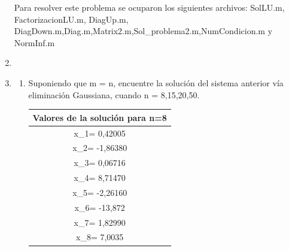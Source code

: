 \documentclass{udpreport}
\begin{document}
\begin{enumerate}
             	Para resolver este problema se ocuparon los siguientes archivos: SolLU.m, FactorizacionLU.m, DiagUp.m, DiagDown.m,Diag.m,Matrix2.m,Sol\_problema2.m,NumCondicion.m y NormInf.m	
        \item
        \item
                \begin{enumerate}
            \item Suponiendo que m = n, encuentre la solución del sistema anterior vía eliminación Gaussiana, cuando n = 8,15,20,50.
            \begin{table}[H]
        \centering
            \begin{tabular} {|c|}
            \hline
            Valores de la solución para n=8 \\
            \hline
            x_{1}=  0,42005\\
            \hline
            x_{2}=  -1,86380\\
            \hline
            x_{3}=  0,06716\\
            \hline
            x_{4}=  8,71470\\
            \hline
            x_{5}=  -2,26160\\
            \hline
            x_{6}=  -13,872\\
            \hline
            x_{7}=  1,82990\\
            \hline
            x_{8}=  7,0035\\
            \hline
            \end{tabular}
        \end{table}
        
        \begin{table}[H]
        \centering
            \begin{tabular} { |c|}
            

\end{tabular}
\end{table}
\end{enumerate}
\end{enumerate}
\end{document}

